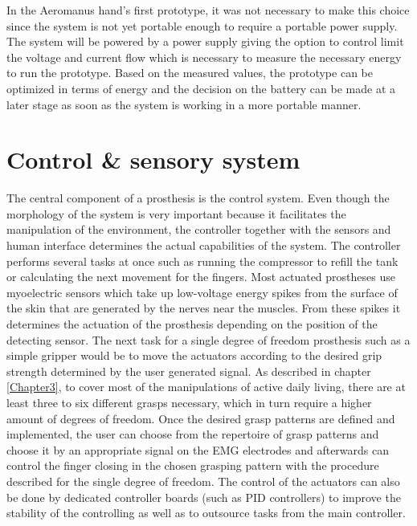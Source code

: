 \documentclass[main]{subfiles}
\begin{document}
In the Aeromanus hand's first prototype, it was not necessary to make this choice since the system is not yet portable enough to require a portable power supply. The system will be powered by a power supply giving the option to control limit the voltage and current flow which is necessary to measure the necessary energy to run the prototype. Based on the measured values, the prototype can be optimized in terms of energy and the decision on the battery can be made at a later stage as soon as the system is working in a more portable manner.


\section{Control \& sensory system}

The central component of a prosthesis is the control system. Even though the morphology of the system is very important because it facilitates the manipulation of the environment, the controller together with the sensors and human interface determines the actual capabilities of the system. The controller performs several tasks at once such as running the compressor to refill the tank or calculating the next movement for the fingers. Most actuated prostheses use myoelectric sensors which take up low-voltage energy spikes from the surface of the skin that are generated by the nerves near the muscles. From these spikes it determines the actuation of the prosthesis depending on the position of the detecting sensor. The next task for a single degree of freedom prosthesis such as a simple gripper would be to move the actuators according to the desired grip strength determined by the user generated signal. As described in chapter \ref{Chapter3}, to cover most of the manipulations of active daily living, there are at least three to six different grasps necessary, which in turn require a higher amount of degrees of freedom. Once the desired grasp patterns are defined and implemented, the user can choose from the repertoire of grasp patterns and choose it by an appropriate signal on the EMG electrodes and afterwards can control the finger closing in the chosen grasping pattern with the procedure described for the single degree of freedom. The control of the actuators can also be done by dedicated controller boards (such as PID controllers) to improve the stability of the controlling as well as to outsource tasks from the main controller.
\end{document}
